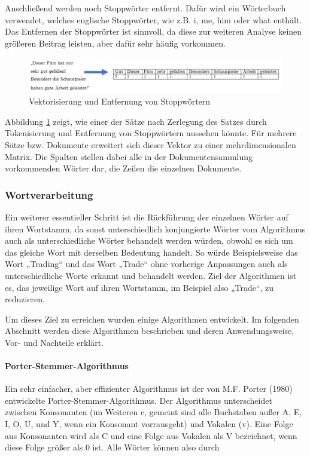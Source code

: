 \documentclass[a4paper,12pt]{article}
\begin{document}
Anschließend werden noch Stoppwörter entfernt. Dafür wird ein Wörterbuch verwendet, welches englische Stoppwörter, wie z.B. i, me, him oder what enthält. Das Entfernen der Stoppwörter ist sinnvoll, da diese zur weiteren Analyse keinen größeren Beitrag leisten, aber dafür sehr häufig vorkommen. 


\begin{figure}[ht]
\centering
\includegraphics[scale=0.9] {Vect}
\caption[Vektorisierung und Entfernung von Stoppwörtern]{Vektorisierung und Entfernung von Stoppwörtern}
\label{Vect}
\end{figure}

Abbildung \ref{Vect} zeigt, wie einer der Sätze nach Zerlegung des Satzes durch Tokenisierung und Entfernung von Stoppwörtern aussehen könnte. Für mehrere Sätze bzw. Dokumente erweitert sich dieser Vektor zu einer mehrdimensionalen Matrix. Die Spalten stellen dabei alle in der Dokumentensammlung vorkommenden Wörter dar, die Zeilen die einzelnen Dokumente. 

\subsubsection{Wortverarbeitung}
Ein weiterer essentieller Schritt ist die Rückführung der einzelnen Wörter auf ihren Wortstamm, da sonst unterschiedlich konjungierte Wörter vom Algorithmus auch als unterschiedliche Wörter behandelt werden würden, obwohl es sich um das gleiche Wort mit derselben Bedeutung handelt. So würde Beispielsweise das Wort „Trading“ und das Wort „Trade“ ohne vorherige Anpassungen auch als unterschiedliche Worte erkannt und behandelt werden. Ziel der Algorithmen ist es, das jeweilige Wort auf ihren Wortstamm, im Beispiel also „Trade“, zu reduzieren. 

Um dieses Ziel zu erreichen wurden einige Algorithmen entwickelt. Im folgenden Abschnitt werden diese Algorithmen beschrieben und deren Anwendungsweise, Vor- und Nachteile erklärt. 

\paragraph{Porter-Stemmer-Algorithmus}
Ein sehr einfacher, aber effizienter Algorithmus ist der von M.F. Porter (1980) entwickelte Porter-Stemmer-Algorithmus. Der Algorithmus unterscheidet zwischen Konsonanten (im Weiteren c, gemeint sind alle Buchstaben außer A, E, I, O, U, und Y, wenn ein Konsonant vorrausgeht) und Vokalen (v). Eine Folge aus Konsonanten wird als C und eine Folge aus Vokalen als V bezeichnet, wenn diese Folge größer als 0 ist. Alle Wörter können also durch 
\end{document}
